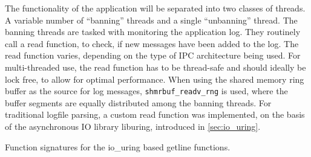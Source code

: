 The functionality of the application will be separated into two classes of threads. A variable number of ``banning'' threads
and a single ``unbanning'' thread. The banning threads are tasked with monitoring the application log. They routinely call a read
function, to check, if new messages have been added to the log. The read function varies, depending on the type of \ac{IPC} architecture
being used. For multi-threaded use, the read function has to be thread-safe and should ideally be lock free, to allow for optimal performance.
When using the shared memory ring buffer as the source for log messages, \texttt{shmrbuf\_readv\_rng} is used, where the buffer segments
are equally distributed among the banning threads. For traditional logfile parsing, a custom read function was implemented, on the
basis of the asynchronous \ac{IO} library liburing, introduced in \ref{sec:io_uring}.

\begin{algorithm}[h!]
    
    \caption[Asynchronous Getline Function]{Function signatures for the io\_uring based getline functions.}
    \label{alg:uring_getline}
\end{algorithm}

